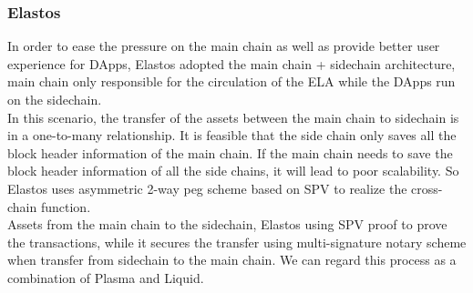 \subsubsection{Elastos}
\noindent In order to ease the pressure on the main chain as well as provide better user experience for DApps, Elastos\cite{Elastos} adopted the main chain + sidechain architecture,  main chain only responsible for the circulation of the ELA while the DApps run on the sidechain. \\
\noindent In this scenario, the transfer of the assets between the main chain to sidechain is in a one-to-many relationship. It is feasible that the side chain only saves all the block header information of the main chain. If the main chain needs to save the block header information of all the side chains, it will lead to poor scalability. So Elastos uses asymmetric 2-way peg scheme based on SPV to realize the cross-chain function.\\
\noindent Assets from the main chain to the sidechain, Elastos using SPV proof to prove the transactions, while it secures the transfer using multi-signature notary scheme when transfer from sidechain to the main chain. We can regard this process as a combination of Plasma and Liquid.
